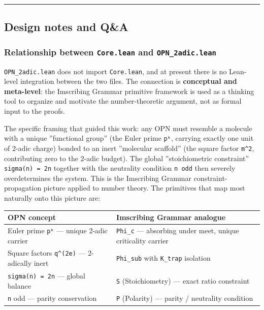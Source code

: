 \documentclass[12pt,a4paper]{article}
\begin{document}
\begin{center}
\rule{0.5\textwidth}{0.4pt}
\end{center}

\subsection{Design notes and Q\&A}

\subsubsection{Relationship between \texttt{Core.lean} and \texttt{OPN\_2adic.lean}}

\texttt{OPN\_2adic.lean} does not import \texttt{Core.lean}, and at present there is no Lean-level integration
between the two files. The connection is \textbf{conceptual and meta-level}: the Imscribing Grammar
primitive framework is used as a thinking tool to organize and motivate the number-theoretic
argument, not as formal input to the proofs.

The specific framing that guided this work: any OPN must resemble a molecule with a unique
''functional group'' (the Euler prime \texttt{pᵏ}, carrying exactly one unit of 2-adic charge) bonded to
an inert ''molecular scaffold'' (the square factor \texttt{m\^{}2}, contributing zero to the 2-adic budget).
The global ''stoichiometric constraint'' \texttt{sigma(n) = 2n} together with the neutrality condition \texttt{n odd}
then severely overdetermines the system. This is the Imscribing Grammar constraint-propagation picture
applied to number theory. The primitives that map most naturally onto this picture are:

\begin{table}[htbp]
\centering
\small
{}
\begin{tabularx}{\textwidth}{>{\centering\arraybackslash}X >{\centering\arraybackslash}X}
\toprule
\rowcolor{gray!25}\textbf{OPN concept} & \textbf{Imscribing Grammar analogue} \\
\midrule
\rowcolors{1}{white}{gray!10}
Euler prime \texttt{pᵏ} --- unique 2-adic carrier & \texttt{Phi\_c} --- absorbing under meet, unique criticality carrier \\
Square factors \texttt{q\^{}(2e)} --- 2-adically inert & \texttt{Phi\_sub} with \texttt{K\_trap} isolation \\
\texttt{sigma(n) = 2n} --- global balance & \texttt{S} (Stoichiometry) --- exact ratio constraint \\
\texttt{n} odd --- parity conservation & \texttt{P} (Polarity) --- parity / neutrality condition \\
\bottomrule
\end{tabularx}
\end{table}
\end{document}
